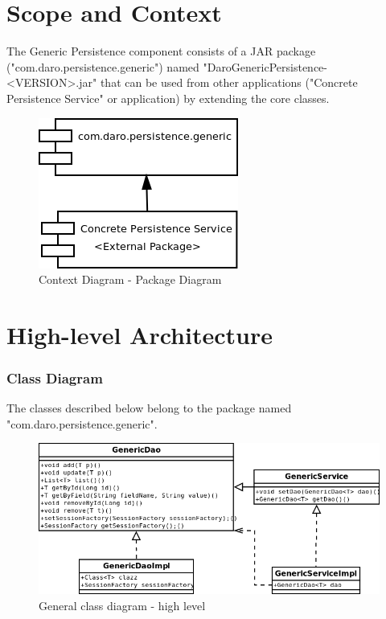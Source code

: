 \documentclass[a4paper,11pt]{book}
\begin{document}
\section{Scope and Context}
The Generic Persistence component consists of a JAR package ("com.daro.persistence.generic") named "DaroGenericPersistence-<VERSION>.jar" that can be used from other applications ("Concrete Persistence Service" or application) by extending the core classes.

\begin{figure}[h] %
  \includegraphics{generic_persistence_package_diagram}
  \caption{Context Diagram - Package Diagram}
  \centering
  \label{fig:context} %
\end{figure}

\section{High-level Architecture}

\pagebreak
\subsubsection{Class Diagram}
The classes described below belong to the package named "com.daro.persistence.generic".

\begin{figure}[h] %
  \includegraphics[width=\textwidth]{generic_persistence_class_diagram}
  \caption{General class diagram - high level}
  \centering
  \label{fig:generic_persistence_class_diagram} %
\end{figure}
\end{document}
